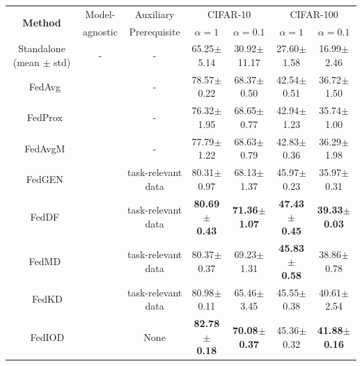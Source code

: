 \documentclass[letterpaper]{article} %
\newcommand{\cmark}{\ding{51}}%
\newcommand{\xmark}{\ding{55}}%
\begin{document}
\begin{table}[]
\centering
\resizebox{\textwidth}{!}
{
\begin{tabular}{cc|c|c|cc|cc}
\toprule
\multicolumn{2}{c|}{\multirow{2}{*}{\textbf{Method}}} 
&Model- &Auxiliary  &
\multicolumn{2}{c|}{CIFAR-10} & 
\multicolumn{2}{c}{CIFAR-100} \\ 
& %
&agnostic & Prerequisite
&$\alpha=1$ &$\alpha=0.1$ &$\alpha=1$ &$\alpha=0.1$ \\
\midrule 
\multicolumn{2}{c|}{Standalone (mean $\pm$ std)}
&- &- &65.25$\pm$ 5.14 & 30.92$\pm$  11.17 &27.60$\pm$ 1.58 &16.99$\pm$ 2.46 
\\ \midrule
\parbox[t]{6mm}{} &FedAvg~\cite{mcmahan2017communication}
&\xmark &-
&
78.57$\pm$ 0.22 & 
68.37$\pm$ 0.50 
&
42.54$\pm$ 0.51 &
36.72$\pm$ 1.50 \\
&FedProx~\cite{li2018federated}
&\xmark &-
&
76.32$\pm$ 1.95 & 
68.65$\pm$ 0.77
&
42.94$\pm$ 1.23 & 
35.74$\pm$ 1.00 \\
&FedAvgM~\cite{hsu2019measuring}
&\xmark &-
&
77.79$\pm$ 1.22 & 
68.63$\pm$ 0.79 
&
42.83$\pm$ 0.36 & 
36.29$\pm$ 1.98 \\
&FedGEN~\cite{zhu2021data} 
&\xmark &task-relevant data 
&
80.31$\pm$ 0.97 & 
68.13$\pm$ 1.37  
&
45.97$\pm$ 0.23& 
35.97$\pm$ 0.31\\
&FedDF~\cite{lin2020ensemble}
&\xmark &task-relevant data 
&
\bf{80.69$\pm$ 0.43} & 
\bf{71.36$\pm$ 1.07}  
& 
\bf{47.43$\pm$ 0.45} & 
\bf{39.33$\pm$ 0.03} \\\midrule
\parbox[t]{6mm}{} &FedMD~\cite{li2019fedmd}
&\cmark & task-relevant data 
&
80.37$\pm$ 0.37 & 
{69.23}$\pm$ 1.31 
&
\bf{45.83$\pm$ 0.58} & 
38.86$\pm$ 0.78 \\
&FedKD \cite{gong2022preserving}
&\cmark &task-relevant data 
&
{80.98}$\pm$ 0.11 & {65.46}$\pm$ 3.45 & {45.55}$\pm$ 0.38& {40.61}$\pm$ 2.54
\\
&FedIOD %
&\cmark &None &\bf{82.78$\pm$ 0.18} &\bf{70.08$\pm$ 0.37} &45.36$\pm$ 0.32 &\bf{41.88$\pm$ 0.16} \\
\bottomrule
\end{tabular}
}
\end{table}
\end{document}
